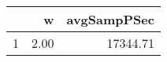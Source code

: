 \begin{table}[h]
\centering
\begingroup\tiny
\begin{tabular}{rrr}
  \hline
 & w & avgSampPSec \\ 
  \hline
1 & 2.00 & 17344.71 \\ 
   \hline
\end{tabular}
\endgroup
\end{table}
